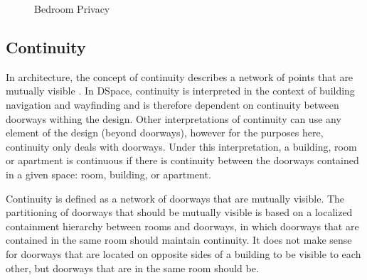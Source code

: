 \documentclass[12pt]{ucthesis}
\begin{document}
\begin{figure}[H]
 \centering
  \hspace{5mm}
 \caption{Bedroom Privacy}
\label{room-privacy}
\end{figure}

\subsection{Continuity}
In architecture, the concept of continuity describes a network of points that are mutually visible \cite{Key}. In DSpace, continuity is interpreted in the context of building navigation and wayfinding and is therefore dependent on continuity between doorways withing the design. Other interpretations of continuity can use any element of the design (beyond doorways), however for the purposes here, continuity only deals with doorways. Under this interpretation, a building, room or apartment is continuous if there is continuity between the doorways contained in a given space: room, building, or apartment. 

Continuity is defined as a network of doorways that are mutually visible. The partitioning of doorways that should be mutually visible is based on a localized containment hierarchy between rooms and doorways, in which doorways that are contained in the same room should maintain continuity. It does not make sense for doorways that are located on opposite sides of a building to be visible to each other, but doorways that are in the same room should be. 
\end{document}
